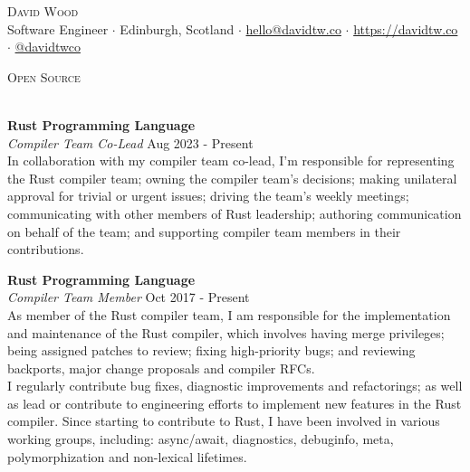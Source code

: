 \documentclass[a4paper]{article}
\newcommand{\lineunder} {
  \vspace*{-8pt} \\
  \hspace*{-18pt} \hrulefill \\
}
\newcommand{\header} [1] {
  {\hspace*{-18pt}\vspace*{6pt} \textsc{#1}}
  \vspace*{-6pt} \lineunder
}
\begin{document}
\fancyhead{}
\renewcommand{\headrulewidth}{0pt}

\fancyfoot{}
\fancyfoot[R]{\scriptsize\scshape\color{gray} \thepage}

\vspace*{-40pt}

\vspace*{-10pt}
\begin{center}
  {\Huge \scshape {David Wood}} \\
  \vspace{2mm}
  Software Engineer $\cdot$
  Edinburgh, Scotland $\cdot$
  \href{mailto:hello@davidtw.co}{hello@davidtw.co} $\cdot$
  \href{https://davidtw.co}{https://davidtw.co} $\cdot$
  \href{https://github.com/davidtwco}{@davidtwco} \\
\end{center}

\header{Open Source}
\vspace{1mm}

\textbf{Rust Programming Language} \\
\textit{Compiler Team Co-Lead} \hfill {\color{gray} Aug 2023 - Present} \\
\vspace{2mm}
In collaboration with my compiler team co-lead, I'm responsible for representing the Rust
compiler team; owning the compiler team's decisions; making unilateral approval for trivial or
urgent issues; driving the team's weekly meetings; communicating with other members of Rust
leadership; authoring communication on behalf of the team; and supporting compiler team members in
their contributions.
\vspace{2mm}

\textbf{Rust Programming Language} \\
\textit{Compiler Team Member} \hfill {\color{gray} Oct 2017 - Present} \\
\vspace{2mm}
As member of the Rust compiler team, I am responsible for the implementation and maintenance of
the Rust compiler, which involves having merge privileges; being assigned patches to review;
fixing high-priority bugs; and reviewing backports, major change proposals and compiler RFCs. \\
\vspace{2mm}
I regularly contribute bug fixes, diagnostic improvements and refactorings; as
well as lead or contribute to engineering efforts to implement new features in the Rust compiler.
Since starting to contribute to Rust, I have been involved in various working groups, including:
async/await, diagnostics, debuginfo, meta, polymorphization and non-lexical lifetimes.
\vspace{2mm}
\end{document}
